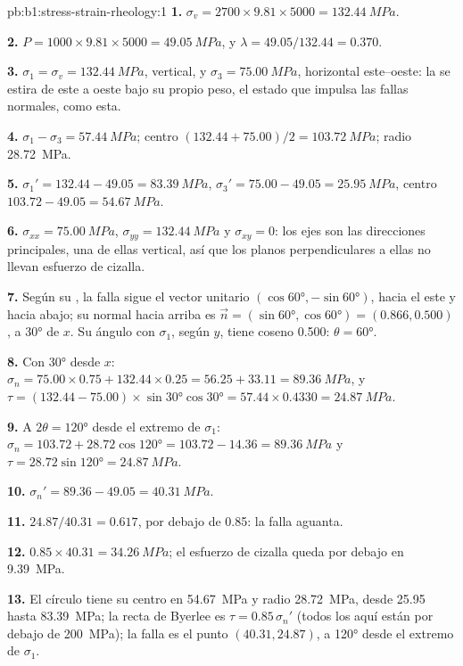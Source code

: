\begin{solution}{pb:b1:stress-strain-rheology:1}
\textbf{1.} $\sigma_v = 2700\times9.81\times5000 = \qty{132.44}{MPa}$.

\textbf{2.} $P = 1000\times9.81\times5000 = \qty{49.05}{MPa}$, y
$\lambda = 49.05/132.44 = 0.370$.

\textbf{3.} $\sigma_1 = \sigma_v = \qty{132.44}{MPa}$, vertical, y
$\sigma_3 = \qty{75.00}{MPa}$, horizontal este--oeste: la  se estira
de este a oeste bajo su propio peso, el estado que impulsa las fallas
normales, como esta.

\textbf{4.} $\sigma_1 - \sigma_3 = \qty{57.44}{MPa}$; centro
$(132.44 + 75.00)/2 = \qty{103.72}{MPa}$; radio \qty{28.72}{MPa}.

\textbf{5.} $\sigma_1' = 132.44 - 49.05 = \qty{83.39}{MPa}$, $\sigma_3' =
75.00 - 49.05 = \qty{25.95}{MPa}$, centro $103.72 - 49.05 = \qty{54.67}{MPa}$.

\textbf{6.} $\sigma_{xx} = \qty{75.00}{MPa}$, $\sigma_{yy} = \qty{132.44}{MPa}$
y $\sigma_{xy} = 0$: los ejes son las direcciones principales, una de ellas
vertical, así que los planos perpendiculares a ellas no llevan esfuerzo de cizalla.

\textbf{7.} Según su , la falla sigue el vector unitario
$(\cos\ang{60}, -\sin\ang{60})$, hacia el este y hacia abajo; su normal hacia arriba
es $\vec n = (\sin\ang{60}, \cos\ang{60}) = (0.866, 0.500)$, a \ang{30} de
$x$. Su ángulo con $\sigma_1$, según $y$, tiene coseno
0.500: $\theta = \ang{60}$.

\textbf{8.} Con \ang{30} desde $x$: $\sigma_n = 75.00\times0.75 + 132.44\times0.25
= 56.25 + 33.11 = \qty{89.36}{MPa}$, y $\tau = (132.44 - 75.00)\times
\sin\ang{30}\cos\ang{30} = 57.44\times0.4330 = \qty{24.87}{MPa}$.

\textbf{9.} A $2\theta = \ang{120}$ desde el extremo de $\sigma_1$:
$\sigma_n = 103.72 + 28.72\cos\ang{120} = 103.72 - 14.36 = \qty{89.36}{MPa}$
y $\tau = 28.72\sin\ang{120} = \qty{24.87}{MPa}$.

\textbf{10.} $\sigma_n' = 89.36 - 49.05 = \qty{40.31}{MPa}$.

\textbf{11.} $24.87/40.31 = 0.617$, por debajo de 0.85: la falla aguanta.

\textbf{12.} $0.85\times40.31 = \qty{34.26}{MPa}$; el esfuerzo de cizalla queda
por debajo en \qty{9.39}{MPa}.

\textbf{13.} El círculo tiene su centro en \qty{54.67}{MPa} y radio
\qty{28.72}{MPa}, desde \num{25.95} hasta \qty{83.39}{MPa}; la recta de Byerlee es
$\tau = 0.85\,\sigma_n'$ (todos los  aquí están por debajo de
\qty{200}{MPa}); la falla es el punto $(40.31, 24.87)$, a \ang{120} desde el
extremo de $\sigma_1$.


\end{solution}
